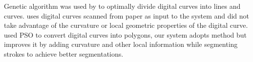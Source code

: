 \documentclass[a4paper,10pt]{IEEEconf}
\begin{document}
Genetic algorithm was used by \cite{CruveDivisionSwarm} to optimally divide digital curves into lines and curves. \citeauthor{CruveDivisionSwarm} uses digital curves scanned from paper as input to the system and did not take advantage of the curvature or local geometric properties of the digital curve. \citeauthor{PolygonApproximationPSO} \cite{PolygonApproximationPSO} used PSO to convert digital curves into polygons, our system adopts \citeauthor{PolygonApproximationPSO} method but improves it by adding curvature and other local information while segmenting strokes to achieve better segmentations.%
\end{document}
